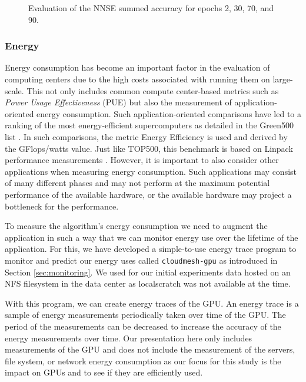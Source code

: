 \documentclass[utf8]{FrontiersinVancouver} %
\begin{document}
\begin{figure}[p]
\begin{center}
  \end{center}

  \caption {Evaluation of the NNSE summed accuracy for epochs 2, 30, 70, and 90.}
  \label{fig:NNSE-comparison-a100-summed}

\end{figure}

\subsubsection{Energy}
\label{sec:perf-energy}


Energy consumption has become an important factor in the evaluation of computing centers due to the high costs associated with running them on large- scale. This not only includes common compute center-based metrics such as {\em Power Usage Effectiveness} (PUE) but also the measurement of application-oriented energy consumption.  Such application-oriented comparisons have led to a ranking of the most energy-efficient supercomputers as detailed in the Green500 list \citep{green500}. In such comparisons, the metric Energy Efficiency is used and derived by the GFlops/watts value. Just like TOP500, this benchmark is based on Linpack performance measurements \cite{www-top500}.  However, it is important to also consider other applications when measuring energy consumption. Such applications may consist of many different phases and may not perform at the maximum potential performance of the available hardware, or the available hardware may project a bottleneck for the performance.

To measure the algorithm's energy consumption we need to augment the application in such a way that we can monitor energy use over the lifetime of the application. For this, we have developed a simple-to-use energy trace program to monitor and predict our energy uses called \verb|cloudmesh-gpu| as introduced in Section \ref{sec:monitoring}.  We used for our initial experiments data hosted on an NFS filesystem in the data center as localscratch was not available at the time.


With this program, we can create energy traces of the GPU. An energy trace is a sample of energy measurements periodically taken over time of the GPU. The period of the measurements can be decreased to increase the accuracy of the energy measurements over time. Our presentation here only includes measurements of the GPU and does not include the measurement of the servers, file system, or network energy consumption as our focus for this study is the impact on GPUs and to see if they are efficiently used.
\end{document}
